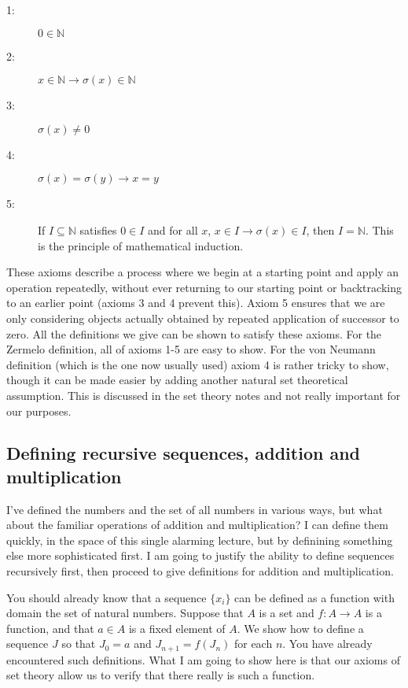 \documentclass[12pt]{article}
\begin{document}
\begin{description}

\item[1:]  $0 \in \mathbb N$

\item[2:]  $x \in \mathbb N \rightarrow \sigma(x) \in \mathbb N$

\item[3:]  $\sigma(x) \neq 0$

\item[4:]  $\sigma(x)=\sigma(y) \rightarrow x=y$

\item[5:]  If $I\subseteq \mathbb N$ satisfies $0 \in I$ and for all $x$, $x \in I \rightarrow \sigma(x)\in I$, then $I=\mathbb N$.  This is the principle of mathematical induction.

\end{description}

These axioms describe a process where we begin at a starting point and apply an operation repeatedly, without ever returning to our starting point or backtracking to an earlier point (axioms 3 and 4 prevent this).  Axiom 5 ensures that we are only considering objects actually obtained by repeated application of successor to zero.  All the definitions we give can be shown to satisfy these axioms.  For the Zermelo definition, all of axioms 1-5 are easy to show.  For the von Neumann definition (which is the one now usually used) axiom 4 is rather tricky to show, though it can be made easier by adding another natural set theoretical assumption.  This is discussed in the set theory notes and not really important for our purposes.

\subsection{Defining recursive sequences, addition and multiplication}

I've defined the numbers and the set of all numbers in various ways, but what about the familiar operations of addition and multiplication?  I can define them quickly, in the space of this single alarming lecture, but by definining something else more sophisticated first.  I am going to justify the ability to define sequences recursively first, then proceed to give definitions for addition and multiplication.


You should already know that a sequence $\{x_i\}$ can be defined as a function with domain the set of natural numbers.
Suppose that $A$ is a set and $f:A \rightarrow A$ is a function, and that $a \in A$ is a fixed element of $A$.  We show how to define a sequence $J$ so that $J_0=a$ and $J_{n+1} = f(J_n)$ for each $n$.  You have already encountered such definitions.  What I am going to show here is that our axioms of set theory allow us to verify that there really is such a function.
\end{document}
